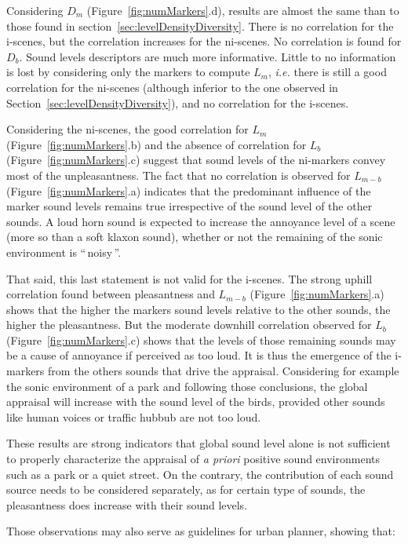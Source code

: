 \documentclass[twoside,twocolumn]{article}
\begin{document}
Considering $D_{m}$ (Figure~\ref{fig:numMarkers}.d), results are almost the same than to those found in section~\ref{sec:levelDensityDiversity}. There is no correlation for the i-scenes, but the correlation increases for the ni-scenes. No correlation is found for $D_{b}$. Sound levels descriptors are much more informative. Little to no information is lost by considering only the markers to compute $L_m$, \emph{i.e.} there is still a good correlation for the ni-scenes (although inferior to the one observed in Section~\ref{sec:levelDensityDiversity}), and no correlation for the i-scenes.

Considering the ni-scenes, the good correlation for $L_m$  (Figure~\ref{fig:numMarkers}.b) and the absence of correlation for $L_{b}$  (Figure~\ref{fig:numMarkers}.c) suggest that sound levels of the ni-markers convey most of the unpleasantness. The fact that no correlation is observed for $L_{m-b}$ (Figure~\ref{fig:numMarkers}.a) indicates that the predominant influence of the marker sound levels remains true irrespective of the sound level of the other sounds. A loud horn sound is expected to increase the annoyance level of a scene (more so than a soft klaxon sound), whether or not the remaining of the sonic environment is ``\,noisy\,''.

That said, this last statement is not valid for the i-scenes. The strong uphill correlation found between pleasantness and  $L_{m-b}$ (Figure~\ref{fig:numMarkers}.a) shows that the higher the markers sound levels relative to the other sounds, the higher the pleasantness. But the moderate downhill correlation observed for $L_{b}$ (Figure~\ref{fig:numMarkers}.c) shows that the levels of those remaining sounds may be a cause of annoyance if perceived as too loud. It is thus the emergence of the i-markers from the others sounds that drive the appraisal. Considering for example the sonic environment of a park and following those conclusions, the global appraisal will increase with the sound level of the birds, provided other sounds like human voices or traffic hubbub are not too loud.

These results are strong indicators that global sound level alone is not sufficient to properly characterize the appraisal of \emph{a priori} positive sound environments such as a park or a quiet street. On the contrary, the contribution of each sound source needs to be considered separately, as for certain type of sounds, the pleasantness does increase with their sound levels.

Those observations may also serve as guidelines for urban planner, showing that:
\end{document}
